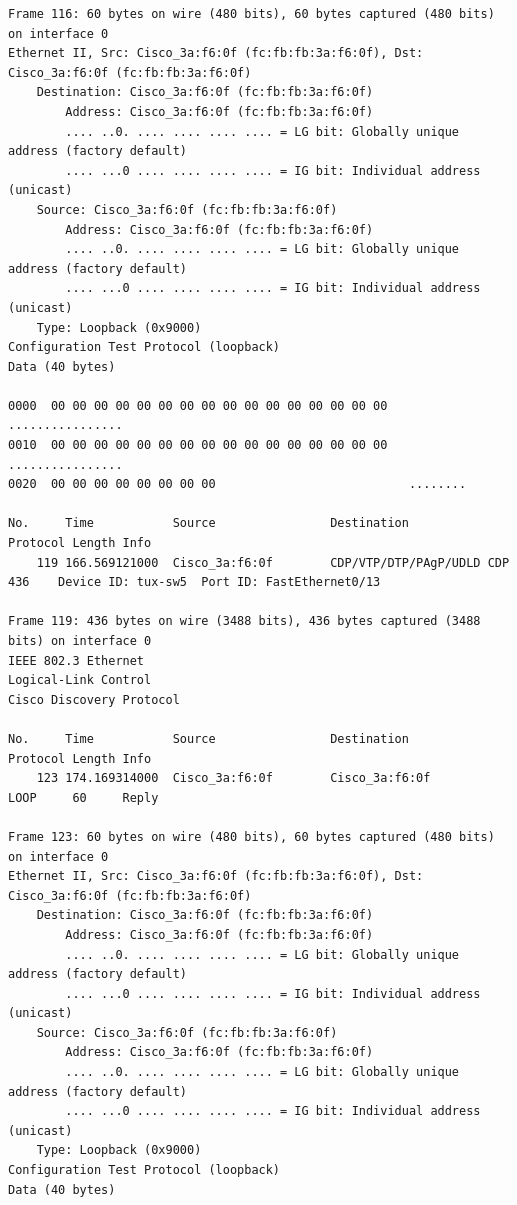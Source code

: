 \documentclass[a4paper,11pt]{article}
\begin{document}
\begin{lstlisting}
Frame 116: 60 bytes on wire (480 bits), 60 bytes captured (480 bits) on interface 0
Ethernet II, Src: Cisco_3a:f6:0f (fc:fb:fb:3a:f6:0f), Dst: Cisco_3a:f6:0f (fc:fb:fb:3a:f6:0f)
    Destination: Cisco_3a:f6:0f (fc:fb:fb:3a:f6:0f)
        Address: Cisco_3a:f6:0f (fc:fb:fb:3a:f6:0f)
        .... ..0. .... .... .... .... = LG bit: Globally unique address (factory default)
        .... ...0 .... .... .... .... = IG bit: Individual address (unicast)
    Source: Cisco_3a:f6:0f (fc:fb:fb:3a:f6:0f)
        Address: Cisco_3a:f6:0f (fc:fb:fb:3a:f6:0f)
        .... ..0. .... .... .... .... = LG bit: Globally unique address (factory default)
        .... ...0 .... .... .... .... = IG bit: Individual address (unicast)
    Type: Loopback (0x9000)
Configuration Test Protocol (loopback)
Data (40 bytes)

0000  00 00 00 00 00 00 00 00 00 00 00 00 00 00 00 00   ................
0010  00 00 00 00 00 00 00 00 00 00 00 00 00 00 00 00   ................
0020  00 00 00 00 00 00 00 00                           ........

No.     Time           Source                Destination           Protocol Length Info
    119 166.569121000  Cisco_3a:f6:0f        CDP/VTP/DTP/PAgP/UDLD CDP      436    Device ID: tux-sw5  Port ID: FastEthernet0/13  

Frame 119: 436 bytes on wire (3488 bits), 436 bytes captured (3488 bits) on interface 0
IEEE 802.3 Ethernet 
Logical-Link Control
Cisco Discovery Protocol

No.     Time           Source                Destination           Protocol Length Info
    123 174.169314000  Cisco_3a:f6:0f        Cisco_3a:f6:0f        LOOP     60     Reply

Frame 123: 60 bytes on wire (480 bits), 60 bytes captured (480 bits) on interface 0
Ethernet II, Src: Cisco_3a:f6:0f (fc:fb:fb:3a:f6:0f), Dst: Cisco_3a:f6:0f (fc:fb:fb:3a:f6:0f)
    Destination: Cisco_3a:f6:0f (fc:fb:fb:3a:f6:0f)
        Address: Cisco_3a:f6:0f (fc:fb:fb:3a:f6:0f)
        .... ..0. .... .... .... .... = LG bit: Globally unique address (factory default)
        .... ...0 .... .... .... .... = IG bit: Individual address (unicast)
    Source: Cisco_3a:f6:0f (fc:fb:fb:3a:f6:0f)
        Address: Cisco_3a:f6:0f (fc:fb:fb:3a:f6:0f)
        .... ..0. .... .... .... .... = LG bit: Globally unique address (factory default)
        .... ...0 .... .... .... .... = IG bit: Individual address (unicast)
    Type: Loopback (0x9000)
Configuration Test Protocol (loopback)
Data (40 bytes)


\end{lstlisting}
\end{document}
